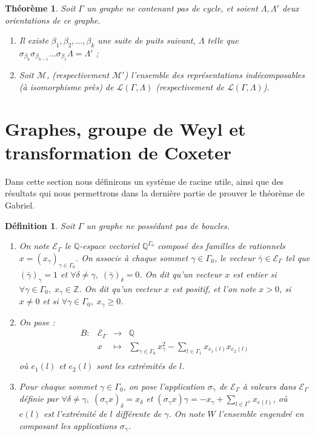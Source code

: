 \documentclass[a4paper,10pt]{article}
\newtheorem{thm}{Théorème}[section]
\newtheorem{defi}[]{Définition}[section]
\begin{document}
\begin{thm}
Soit $\Gamma$ un graphe ne contenant pas de cycle, et soient $\Lambda,\Lambda'$ deux orientations de ce graphe. 
\begin{enumerate}
	\item Il existe $\beta_1,\beta_2,\dots,\beta_k$ une suite de puits suivant, $\Lambda$ telle que $\sigma_{\beta_k}\sigma_{\beta_{k-1}}\dots\sigma_{\beta_1}\Lambda=\Lambda'$ ;
	\item Soit $\mathscr M$, (respectivement $\mathscr M'$) l'ensemble des représentations indécomposables (à isomorphisme près) de $\mathscr L(\Gamma,\Lambda)$ (respectivement de $\mathscr L(\Gamma,\Lambda)$). 
\end{enumerate}
\end{thm}
		\clearpage
\section{Graphes, groupe de Weyl et transformation de Coxeter}
	Dans cette section nous définirons un système de racine utile, ainsi que des résultats qui nous permettrons dans la dernière partie de prouver le théorème de Gabriel.
		\begin{defi}
		Soit $\Gamma$ un graphe ne possédant pas de boucles.
		\begin{enumerate}
			\item On note $\mathscr E_{\Gamma}$ le $\mathbb Q$-espace vectoriel $\mathbb Q^{\Gamma_0}$ composé des familles de rationnels $x=(x_\gamma)_{\gamma\in\Gamma_0}$. On associe à chaque sommet $\gamma\in\Gamma_0$, le vecteur $\bar{\gamma}\in\mathscr E_\Gamma$ tel que $(\bar\gamma)_\gamma=1$ et $\forall \delta\neq\gamma,\;(\bar\gamma)_\delta=0$. On dit qu'un vecteur $x$ est entier si $\forall\gamma\in\Gamma_{0},\;x_\gamma\in\mathbb Z$. On dit qu'un vecteur $x$ est positif, et l'on note $x>0$, si $x\neq0$ et si $\forall\gamma\in\Gamma_0,\;x_\gamma\geq0$.
			\item On pose :
				\[
				\begin{array}{rccc}
					B:&\mathscr E_{\Gamma}&\rightarrow&\mathbb Q\\
					&x&\mapsto&\underset{\gamma\in\Gamma_0}{\sum} x_\gamma^2-\underset{l\in\Gamma_1}{\sum}x_{e_1(l)}x_{e_2(l)}\\
				\end{array}
			\]
			où $e_1(l)$ et $e_2(l)$ sont les extrémités de $l$.
		\item Pour chaque sommet $\gamma\in\Gamma_0$, on pose l'application $\sigma_\gamma$ de $\mathscr E_\Gamma$ à valeurs dans $\mathscr E_\Gamma$ définie par $\forall\delta\neq\gamma,\; (\sigma_\gamma x)_\delta=x_\delta$ et $(\sigma_\gamma x)\gamma=-x_\gamma+\sum_{l\in\Gamma^\gamma}x_{e(l)}$, où $e(l)$ est l'extrémité de $l$ différente de $\gamma$. On note $W$ l'ensemble engendré en composant les applications $\sigma_\gamma$.
		\end{enumerate}
		\end{defi}
\end{document}
